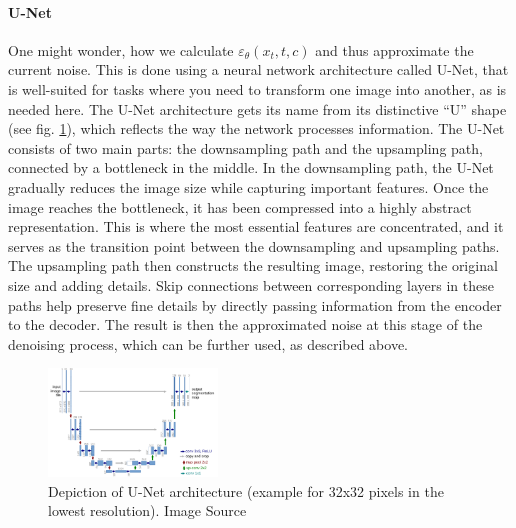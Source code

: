\documentclass[11pt]{article}
\begin{document}
\paragraph{U-Net}
One might wonder, how we calculate $\varepsilon_\theta(x_t,t,c)$ and thus approximate the current noise. This is done using a neural network architecture called U-Net\cite{ronneberger2015unetconvolutionalnetworksbiomedical}, that is well-suited for tasks where you need to transform one image into another, as is needed here.
The U-Net architecture gets its name from its distinctive ``U'' shape (see fig. \ref{fig:unet}), which reflects the way the network processes information. The U-Net consists of two main parts: the downsampling path and the upsampling path, connected by a bottleneck in the middle.
In the downsampling path, the U-Net gradually reduces the image size while capturing important features. Once the image reaches the bottleneck, it has been compressed into a highly abstract representation. This is where the most essential features are concentrated, and it serves as the transition point between the downsampling and upsampling paths. The upsampling path then constructs the resulting image, restoring the original size and adding details. Skip connections between corresponding layers in these paths help preserve fine details by directly passing information from the encoder to the decoder.
The result is then the approximated noise at this stage of the denoising process, which can be further used, as described above.

\begin{figure}[h]
    \centering
    \includegraphics[width=0.4\textwidth]{assets/u-net-illustration-correct-scale2.pdf}
    \caption{Depiction of U-Net architecture (example for 32x32 pixels in the lowest resolution). Image Source \cite{ronneberger2015unetconvolutionalnetworksbiomedical}}
    \label{fig:unet}
\end{figure}
\end{document}
